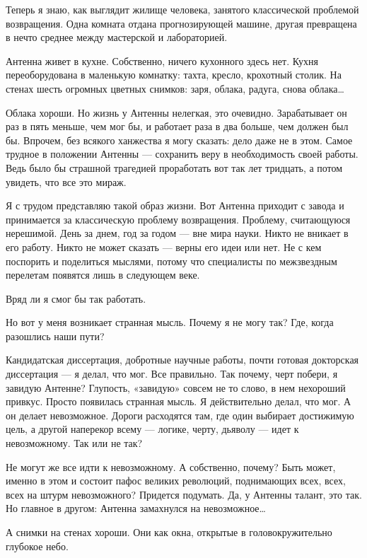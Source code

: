 Теперь  я  знаю,  как  выглядит  жилище  человека,  занятого  классической
проблемой возвращения. Одна комната  отдана прогнозирующей машине,  другая
превращена в нечто среднее между мастерской и лабораторией.

Антенна живет  в  кухне. Собственно,  ничего  кухонного здесь  нет.  Кухня
переоборудована в маленькую комнатку: тахта, кресло, крохотный столик.  На
стенах шесть огромных цветных снимков: заря, облака, радуга, снова облака…

Облака хороши. Но жизнь у Антенны нелегкая, это очевидно. Зарабатывает  он
раз в пять меньше, чем  мог бы, и работает раза  в два больше, чем  должен
был бы. Впрочем,  без всякого  ханжества я могу  сказать: дело  даже не  в
этом. Самое трудное в положении  Антенны — сохранить веру в  необходимость
своей работы.  Ведь было  бы страшной  трагедией проработать  вот так  лет
тридцать, а потом увидеть, что все это мираж.

Я с трудом представляю такой образ жизни. Вот Антенна приходит с завода  и
принимается за  классическую проблему  возвращения. Проблему,  считающуюся
нерешимой. День за днем, год за годом — вне мира науки. Никто не вникает в
его работу. Никто  не может сказать  — верны его  идеи или нет.  Не с  кем
поспорить и  поделиться мыслями,  потому  что специалисты  по  межзвездным
перелетам появятся лишь в следующем веке.

Вряд ли я смог бы так работать.

Но вот у меня возникает странная мысль.  Почему я не могу так? Где,  когда
разошлись наши пути?

Кандидатская  диссертация,   добротные  научные   работы,  почти   готовая
докторская диссертация — я делал, что мог. Все правильно. Так почему, черт
побери, я завидую Антенне? Глупость, «завидую»  совсем не то слово, в  нем
нехороший привкус. Просто появилась странная мысль. Я действительно делал,
что мог. А он делает невозможное. Дороги расходятся там, где один выбирает
достижимую цель, а другой наперекор всему — логике, черту, дьяволу —  идет
к невозможному. Так или не так?

Не могут же  все идти к  невозможному. А собственно,  почему? Быть  может,
именно в этом и состоит  пафос великих революций, поднимающих всех,  всех,
всех на штурм невозможного? Придется  подумать. Да, у Антенны талант,  это
так. Но главное в другом: Антенна замахнулся на невозможное…

А снимки  на стенах  хороши. Они  как окна,  открытые в  головокружительно
глубокое небо.

